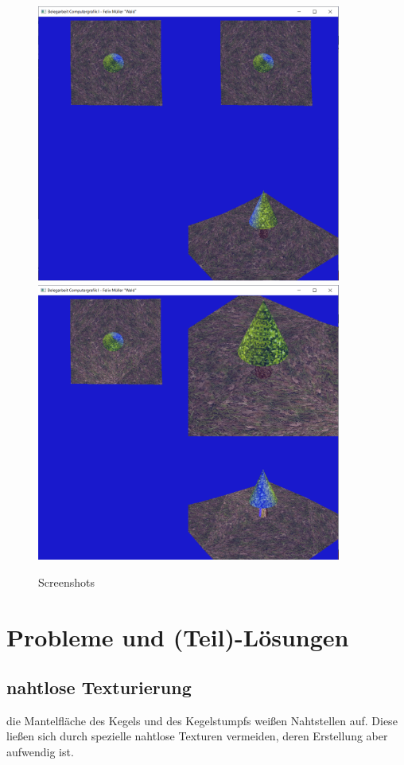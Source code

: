 \documentclass{scrartcl}
\begin{document}
\begin{figure}[H]
 \centering
 \includegraphics[width=10cm]{1.png}
 \\
 \includegraphics[width=10cm]{2.png}
 \caption{Screenshots}
\end{figure}

\section{Probleme und (Teil)-Lösungen}

\subsection{nahtlose Texturierung}

die Mantelfläche des Kegels und des Kegelstumpfs weißen Nahtstellen auf. Diese ließen sich durch spezielle nahtlose Texturen vermeiden, deren Erstellung aber aufwendig ist.
\end{document}
